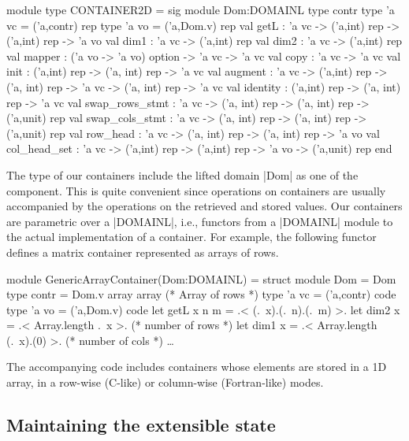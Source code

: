 \documentclass[draft]{elsart}
\begin{document}
\begin{code}
module type CONTAINER2D = sig
  module Dom:DOMAINL
  type contr
  type 'a vc = ('a,contr) rep
  type 'a vo = ('a,Dom.v) rep
  val getL : 'a vc -> ('a,int) rep -> ('a,int) rep -> 'a vo
  val dim1 : 'a vc -> ('a,int) rep
  val dim2 : 'a vc -> ('a,int) rep
  val mapper : ('a vo -> 'a vo) option -> 'a vc -> 'a vc
  val copy : 'a vc -> 'a vc
  val init : ('a,int) rep -> ('a, int) rep -> 'a vc
  val augment : 'a vc -> ('a,int) rep -> ('a, int) rep -> 'a vc ->
                ('a, int) rep -> 'a vc
  val identity : ('a,int) rep -> ('a, int) rep -> 'a vc
  val swap_rows_stmt : 'a vc -> ('a, int) rep -> ('a, int) rep -> 
                       ('a,unit) rep
  val swap_cols_stmt : 'a vc -> ('a, int) rep -> ('a, int) rep -> 
                       ('a,unit) rep
  val row_head : 'a vc -> ('a, int) rep -> ('a, int) rep -> 'a vo
  val col_head_set : 'a vc -> ('a,int) rep -> ('a,int) rep -> 'a vo -> 
            ('a,unit) rep
end
\end{code}

The type of our containers include the lifted domain |Dom| as one of
the component. This is quite convenient since operations on containers
are usually accompanied by the operations on the retrieved and stored
values. Our containers are parametric over a |DOMAINL|, i.e., functors
from a |DOMAINL| module to the actual implementation of a
container. For example, the following functor defines a matrix
container represented as arrays of rows.

\begin{code}
module GenericArrayContainer(Dom:DOMAINL) =
  struct
  module Dom = Dom
  type contr = Dom.v array array (* Array of rows *)
  type 'a vc = ('a,contr) code
  type 'a vo = ('a,Dom.v) code
  let getL x n m = .< (.~x).(.~n).(.~m) >.
  let dim2 x = .< Array.length .~x >.       (* number of rows *)
  let dim1 x = .< Array.length (.~x).(0) >. (* number of cols *)
  \dots
\end{code}
%
The accompanying code includes containers whose
elements are stored in a 1D array, in a
row-wise (C-like) or column-wise (Fortran-like) modes.


\subsection{Maintaining the extensible state}
\end{document}
